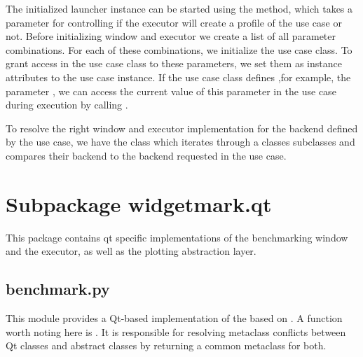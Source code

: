 The initialized launcher instance can be started using the
 method, which takes a parameter
 for controlling if the executor will create a
profile of the use case or not. Before initializing window and executor we
create a list of all parameter combinations. For each of these 
combinations, we initialize the use case class. To grant access in the use case
class to these parameters, we set them as instance attributes to the 
use case instance. If the use case class defines ,for example, the parameter
, we can access the current value of this
parameter in the use case during execution by calling 
.



To resolve the right window and executor implementation for the backend defined
by the use case, we have the class  which
iterates through a classes subclasses and compares their backend to the backend
requested in the use case.





\section{Subpackage widgetmark.qt}

This package contains qt specific implementations of the benchmarking window and
the executor, as well as the plotting abstraction layer.

\subsection{benchmark.py}

This module provides a Qt-based implementation of the
 based on 
. A function worth noting here is
. It is responsible for resolving
metaclass conflicts between Qt classes and abstract classes by returning a
common metaclass for both.




